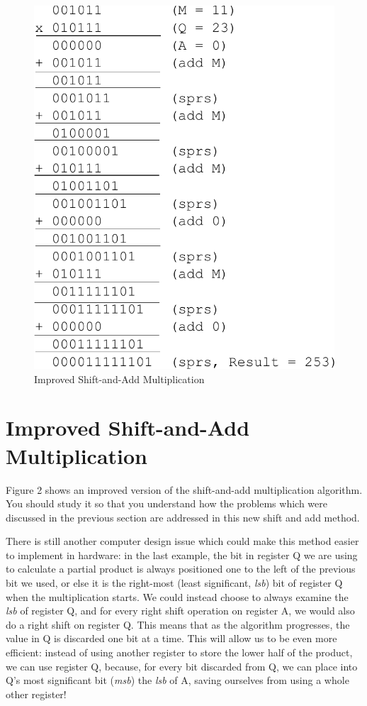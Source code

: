\documentclass{article}
\begin{document}
\begin{figure}[h]
\centering
\includegraphics[scale=0.7]{isaam2.pdf}
\caption{Improved Shift-and-Add Multiplication}
\end{figure}

\pagebreak

\section{Improved Shift-and-Add Multiplication}
Figure 2 shows an improved version of the shift-and-add multiplication algorithm.
You should study it so that you understand how the problems which were discussed in the previous section are addressed in this new shift and add method.

There is still another computer design issue which could make this method easier to implement in hardware: in the last example, the bit in register Q we are using to calculate a partial product is always positioned one to the left of the previous bit we used, or else it is the right-most (least significant, \emph{lsb}) bit of register Q when the multiplication starts.
We could instead choose to always examine the \emph{lsb} of register Q, and for every right shift operation on register A, we would also do a right shift on register Q.
This means that as the algorithm progresses, the value in Q is discarded one bit at a time.%
This will allow us to be even more efficient: instead of using another register to store the lower half of the product, we can use register Q, because, for every bit discarded from Q, we can place into Q's most significant bit (\emph{msb}) the \emph{lsb} of A, saving ourselves from using a whole other register!
\end{document}
